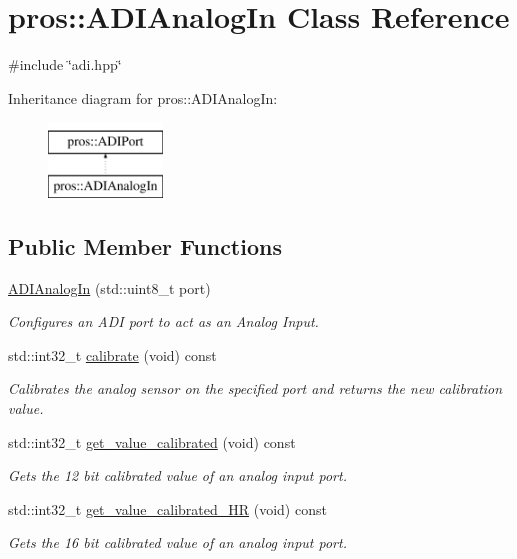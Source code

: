 \hypertarget{classpros_1_1ADIAnalogIn}{}\section{pros\+:\+:A\+D\+I\+Analog\+In Class Reference}
\label{classpros_1_1ADIAnalogIn}


{\ttfamily \#include \char`\"{}adi.\+hpp\char`\"{}}

Inheritance diagram for pros\+:\+:A\+D\+I\+Analog\+In\+:\begin{figure}[H]
\begin{center}
\leavevmode
\includegraphics[height=2.000000cm]{classpros_1_1ADIAnalogIn}
\end{center}
\end{figure}
\subsection*{Public Member Functions}
\begin{DoxyCompactItemize}
\item 
\hyperlink{classpros_1_1ADIAnalogIn_aeac81958e7ba33ee9693ab843f5b55ed}{A\+D\+I\+Analog\+In} (std\+::uint8\+\_\+t port)
\begin{DoxyCompactList}\small\item\em Configures an A\+DI port to act as an Analog Input. \end{DoxyCompactList}\item 
std\+::int32\+\_\+t \hyperlink{classpros_1_1ADIAnalogIn_ac8dd1e625cbcec4951d20be0c0fa2d3c}{calibrate} (void) const
\begin{DoxyCompactList}\small\item\em Calibrates the analog sensor on the specified port and returns the new calibration value. \end{DoxyCompactList}\item 
std\+::int32\+\_\+t \hyperlink{classpros_1_1ADIAnalogIn_a5930ce87c880833bda8cd202613b8d80}{get\+\_\+value\+\_\+calibrated} (void) const
\begin{DoxyCompactList}\small\item\em Gets the 12 bit calibrated value of an analog input port. \end{DoxyCompactList}\item 
std\+::int32\+\_\+t \hyperlink{classpros_1_1ADIAnalogIn_a65bfed175ed1b0efce4566e78e7f9473}{get\+\_\+value\+\_\+calibrated\+\_\+\+HR} (void) const
\begin{DoxyCompactList}\small\item\em Gets the 16 bit calibrated value of an analog input port. \end{DoxyCompactList}\end{DoxyCompactItemize}


